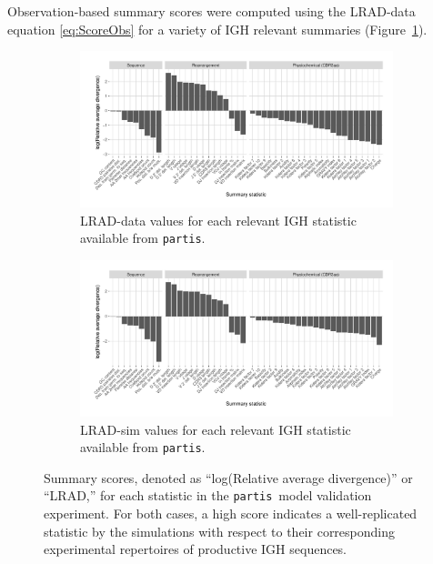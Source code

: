 \documentclass{article}
\newcommand{\partis}{\texttt{partis}}
\begin{document}
Observation-based summary scores were computed using the LRAD-data equation \eqref{eq:ScoreObs} for a variety of IGH relevant summaries (Figure~\ref{fig:ObsScoresBCR}). 
\begin{figure}
	\begin{subfigure}{\textwidth}
    	\includegraphics[width=\linewidth]{Figures/PartisScores/obs_score_plot.pdf}
    	\caption{LRAD-data values for each relevant IGH statistic available from \partis.}
    	\label{fig:ObsScoresBCR}
	\end{subfigure}
	\begin{subfigure}{\textwidth}
    	\includegraphics[width=\linewidth]{Figures/PartisScores/sim_score_plot.pdf}
    	\caption{LRAD-sim values for each relevant IGH statistic available from \partis.}
    	\label{fig:SimScoresBCR}
	\end{subfigure}
	\caption{Summary scores, denoted as ``log(Relative average divergence)'' or ``LRAD,'' for each statistic in the \partis\ model validation experiment. For both cases, a high score indicates a well-replicated statistic by the simulations with respect to their corresponding experimental repertoires of productive IGH sequences.}
	\label{fig:BCRScores}
\end{figure}
\end{document}
